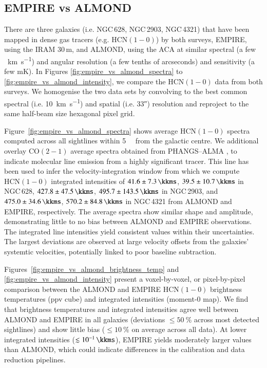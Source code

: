 \documentclass[letter, longauth]{aa} %
\newcommand*{\hcnone}{\ensuremath{\mathrm{HCN(1-0)}}\xspace} %
\newcommand*{\cotwo}{\ensuremath{\mathrm{CO(2-1)}}\xspace} %
\begin{document}
\begin{appendix}

\section{EMPIRE vs ALMOND}
\label{sec:app:empire_vs_almond}

There are three galaxies (i.e. NGC\,628, NGC\,2903, NGC\,4321) that have been mapped in dense gas tracers (e.g. \hcnone) by both surveys, EMPIRE, using the IRAM 30\,m, and ALMOND, using the ACA at similar spectral (a few \SI{}{\km\per\second}) and angular resolution (a few tenths of arcseconds) and sensitivity (a few mK).
In Figures \ref{fig:empire_vs_almond_spectra} to \ref{fig:empire_vs_almond_intensity}, we compare 
the \hcnone data from both surveys.
We homogenise the two data sets by convolving to the best common spectral (i.e. \SI{10}{\km\per\s}) and spatial (i.e. \ang{;;33}) resolution and reproject to the same half-beam size hexagonal pixel grid.

Figure~\ref{fig:empire_vs_almond_spectra} shows average \hcnone spectra computed across all sightlines within \SI{5}{\kilo\parsec} from the galactic centre.
We additional overlay \cotwo average spectra obtained from PHANGS--ALMA \citep{Leroy2021b}, to indicate molecular line emission from a highly significant tracer.
This line has been used to infer the velocity-integration window from which we compute \hcnone integrated intensities of $41.6 \pm \SI{7.3}{\kkms}$, $39.5 \pm \SI{10.7}{\kkms}$ in NGC\,628, $427.8 \pm \SI{47.5}{\kkms}$, $495.7 \pm \SI{143.5}{\kkms}$ in NGC\,2903, and $475.0 \pm \SI{34.6}{\kkms}$, $570.2 \pm \SI{84.8}{\kkms}$ in NGC\,4321 from ALMOND and EMPIRE, respectively.
The average spectra show similar shape and amplitude, demonstrating little to no bias between ALMOND and EMPIRE observations.
The integrated line intensities yield consistent values within their uncertainties.
The largest deviations are observed at large velocity offsets from the galaxies' systemtic velocities, potentially linked to poor baseline subtraction.

Figures~\ref{fig:empire_vs_almond_brightness_temp} and \ref{fig:empire_vs_almond_intensity} present a voxel-by-voxel, or pixel-by-pixel comparison between the ALMOND and EMPIRE \hcnone brightness temperatures (ppv cube) and integrated intensities (moment-0 map).
We find that brightness temperatures and integrated intensities agree well between ALMOND and EMPIRE in all galaxies (deviations $\leq\SI{50}{\percent}$ across most detected sightlines) and show little bias ($\leq\SI{10}{\percent}$ on average across all data).
At lower integrated intensities ($\lesssim\SI{e-1}{\kkms}$), EMPIRE yields moderately larger values than ALMOND, which could indicate differences in the calibration and data reduction pipelines.


\end{appendix}
\end{document}
